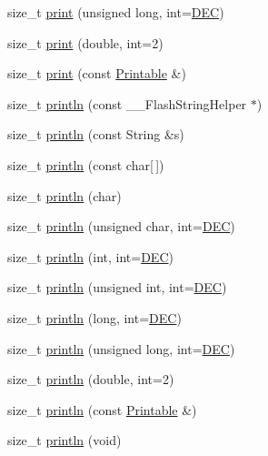 \begin{DoxyCompactItemize}
\item 
size\+\_\+t \hyperlink{class_print_ae3b005981b3f34d0f352632204a52edf}{print} (unsigned long, int=\hyperlink{_print_8h_afe38ec6126e35e40049e27fdf4586ba5}{D\+E\+C})
\item 
size\+\_\+t \hyperlink{class_print_aa538defb056f77e8664a6ef29d281a8c}{print} (double, int=2)
\item 
size\+\_\+t \hyperlink{class_print_a922b3bb2a3e42c1b0c5b1d62b3a8fb3f}{print} (const \hyperlink{class_printable}{Printable} \&)
\item 
size\+\_\+t \hyperlink{class_print_a36d02f29121121bca22cd51d468dfa9e}{println} (const \+\_\+\+\_\+\+Flash\+String\+Helper $\ast$)
\item 
size\+\_\+t \hyperlink{class_print_a44007d63e31bec0bd3854eab1796c53d}{println} (const String \&s)
\item 
size\+\_\+t \hyperlink{class_print_abf944a191b3d93d87782824496fc9856}{println} (const char\mbox{[}$\,$\mbox{]})
\item 
size\+\_\+t \hyperlink{class_print_a6067829b7b76b5a541039c12ae1a9f7d}{println} (char)
\item 
size\+\_\+t \hyperlink{class_print_a0fb229c37a731c53ded8e9e832b4a0a6}{println} (unsigned char, int=\hyperlink{_print_8h_afe38ec6126e35e40049e27fdf4586ba5}{D\+E\+C})
\item 
size\+\_\+t \hyperlink{class_print_a058fbcd23e761e3d2fbe06bb1a07b737}{println} (int, int=\hyperlink{_print_8h_afe38ec6126e35e40049e27fdf4586ba5}{D\+E\+C})
\item 
size\+\_\+t \hyperlink{class_print_ac63f5e2c9a519af617af8880a4912ea7}{println} (unsigned int, int=\hyperlink{_print_8h_afe38ec6126e35e40049e27fdf4586ba5}{D\+E\+C})
\item 
size\+\_\+t \hyperlink{class_print_a173af0cd520b7105bcb2d63ab79d246f}{println} (long, int=\hyperlink{_print_8h_afe38ec6126e35e40049e27fdf4586ba5}{D\+E\+C})
\item 
size\+\_\+t \hyperlink{class_print_a74c918137834a92d0b82537e90d02ed5}{println} (unsigned long, int=\hyperlink{_print_8h_afe38ec6126e35e40049e27fdf4586ba5}{D\+E\+C})
\item 
size\+\_\+t \hyperlink{class_print_a2864f4a5017f1e2e2b8e46a8d185aab0}{println} (double, int=2)
\item 
size\+\_\+t \hyperlink{class_print_aec2662333be402d9f95f7e2a8bbf7202}{println} (const \hyperlink{class_printable}{Printable} \&)
\item 
size\+\_\+t \hyperlink{class_print_a7a21cd59cb8deef99051130e7852e382}{println} (void)
\end{DoxyCompactItemize}
